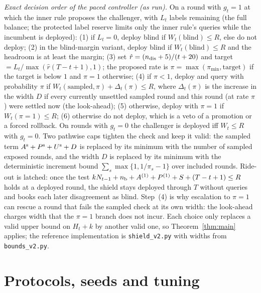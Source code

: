 \documentclass[10pt]{article}
\theoremstyle{plain}
\theoremstyle{definition}
\begin{document}
\emph{Exact decision order of the paced controller (as run).} On a round with $g_t=1$ at which the inner rule proposes the challenger, with $L_t$ labels remaining (the full balance; the protected label reserve limits only the inner rule's queries while the incumbent is deployed): (1) if $L_t=0$, deploy blind if $W_t(\text{blind})\le R$, else do not deploy; (2) in the blind-margin variant, deploy blind if $W_t(\text{blind})\le R$ and the headroom is at least the margin; (3) set $\hat r=(n_{\rm dis}+5)/(t+20)$ and target $=L_t/\max(\hat r(T-t+1),1)$; the proposed rate is $\pi=\max(\pi_{\min},\text{target})$ if the target is below $1$ and $\pi=1$ otherwise; (4) if $\pi<1$, deploy and query with probability $\pi$ if $W_t(\text{sampled},\pi)+\Delta_t(\pi)\le R$, where $\Delta_t(\pi)$ is the increase in the width $D$ if every currently unsettled sampled round and this round (at rate $\pi$) were settled now (the look-ahead); (5) otherwise, deploy with $\pi=1$ if $W_t(\pi{=}1)\le R$; (6) otherwise do not deploy, which is a veto of a promotion or a forced rollback. On rounds with $g_t=0$ the challenger is deployed iff $W_t\le R$ with $g_t=0$. Two pathwise caps tighten the check and keep it valid: the sampled term $A^{\rm s}+P^{\rm s}+U^{\rm s}+D$ is replaced by its minimum with the number of sampled exposed rounds, and the width $D$ is replaced by its minimum with the deterministic increment bound $\sum_s\max\{1,1/\pi_s-1\}$ over included rounds. Ride-out is latched: once the test $kN_{t-1}+n_{\rm b}+A^{(1)}+P^{(1)}+S+(T-t+1)\le R$ holds at a deployed round, the shield stays deployed through $T$ without queries and books each later disagreement as blind. Step~(4) is why escalation to $\pi=1$ can rescue a round that fails the sampled check at its own width: the look-ahead charges width that the $\pi=1$ branch does not incur. Each choice only replaces a valid upper bound on $H_t+k$ by another valid one, so Theorem~\ref{thm:main} applies; the reference implementation is \texttt{shield\_v2.py} with widths from \texttt{bounds\_v2.py}.

\section{Protocols, seeds and tuning}\label{app:protocols}
\end{document}
